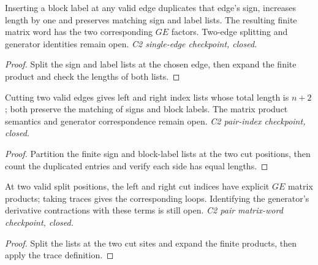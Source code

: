\begin{lemma}
  \label{lem:loop-cut-one}
  \leanok
  Inserting a block label at any valid edge duplicates that edge's sign,
  increases length by one and preserves matching sign and label lists. The
  resulting finite matrix word has the two corresponding $GE$ factors.
  Two-edge splitting and generator identities remain open.
  \emph{C2 single-edge checkpoint, closed.}
\end{lemma}
\begin{proof}\leanok
  Split the sign and label lists at the chosen edge, then expand the finite
  product and check the lengths of both lists.
\end{proof}

\begin{lemma}
  \label{lem:loop-cut-pair}
  \leanok
  Cutting two valid edges gives left and right index lists whose total length
  is $n+2$; both preserve the matching of signs and block labels. The matrix
  product semantics and generator correspondence remain open.
  \emph{C2 pair-index checkpoint, closed.}
\end{lemma}
\begin{proof}\leanok
  Partition the finite sign and block-label lists at the two cut positions,
  then count the duplicated entries and verify each side has equal lengths.
\end{proof}

\begin{lemma}
  \label{lem:loop-cut-pair-word}
  \leanok
  At two valid split positions, the left and right cut indices have explicit
  $GE$ matrix products; taking traces gives the corresponding loops.
  Identifying the generator's derivative contractions with these terms is
  still open. \emph{C2 pair matrix-word checkpoint, closed.}
\end{lemma}
\begin{proof}\leanok
  Split the lists at the two cut sites and expand the finite products, then
  apply the trace definition.
\end{proof}

